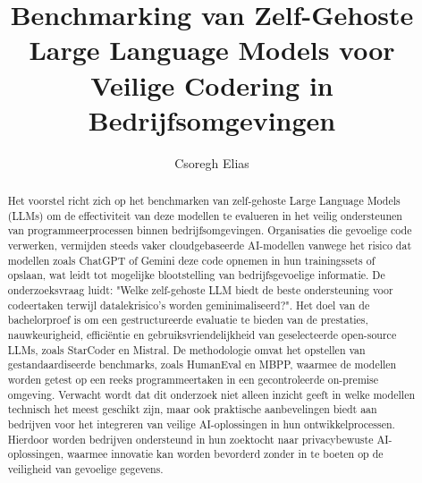 \documentclass{hogent-article}
\title{Benchmarking van Zelf-Gehoste Large Language Models voor Veilige Codering in Bedrijfsomgevingen}
\author{Csoregh Elias}
\begin{document}
\begin{abstract}
  Het voorstel richt zich op het benchmarken van zelf-gehoste Large Language Models (LLMs) om de effectiviteit van deze modellen te evalueren in het veilig ondersteunen van programmeerprocessen binnen bedrijfsomgevingen. Organisaties die gevoelige code verwerken, vermijden steeds vaker cloudgebaseerde AI-modellen vanwege het risico dat modellen zoals ChatGPT of Gemini deze code opnemen in hun trainingssets of opslaan, wat leidt tot mogelijke blootstelling van bedrijfsgevoelige informatie. De onderzoeksvraag luidt: "Welke zelf-gehoste LLM biedt de beste ondersteuning voor codeertaken terwijl datalekrisico’s worden geminimaliseerd?". Het doel van de bachelorproef is om een gestructureerde evaluatie te bieden van de prestaties, nauwkeurigheid, efficiëntie en gebruiksvriendelijkheid van geselecteerde open-source LLMs, zoals StarCoder en Mistral. De methodologie omvat het opstellen van gestandaardiseerde benchmarks, zoals HumanEval en MBPP, waarmee de modellen worden getest op een reeks programmeertaken in een gecontroleerde on-premise omgeving. Verwacht wordt dat dit onderzoek niet alleen inzicht geeft in welke modellen technisch het meest geschikt zijn, maar ook praktische aanbevelingen biedt aan bedrijven voor het integreren van veilige AI-oplossingen in hun ontwikkelprocessen. Hierdoor worden bedrijven ondersteund in hun zoektocht naar privacybewuste AI-oplossingen, waarmee innovatie kan worden bevorderd zonder in te boeten op de veiligheid van gevoelige gegevens.
\end{abstract}

\tableofcontents



\printbibliography[heading=bibintoc]
\end{document}
